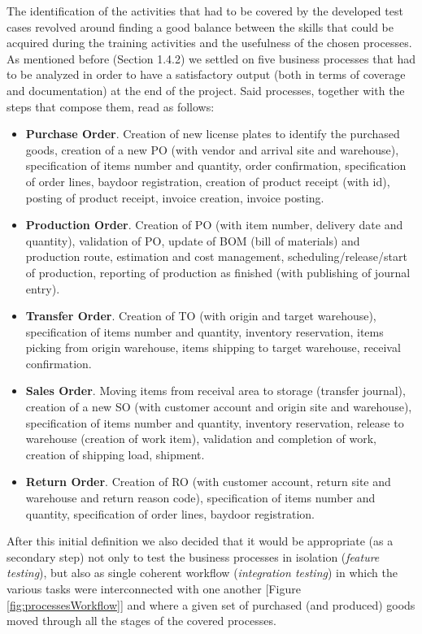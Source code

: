 The identification of the activities that had to be covered by the developed test cases revolved around finding a good balance between the skills that could be acquired during the training activities and the usefulness of the chosen processes. As mentioned before (Section 1.4.2) we settled on five business processes that had to be analyzed in order to have a satisfactory output (both in terms of coverage and documentation) at the end of the project. Said processes, together with the steps that compose them, read as follows:

\begin{itemize}
    \item \textbf{Purchase Order}. Creation of new license plates to identify the purchased goods, creation of a new PO (with vendor and arrival site and warehouse), specification of items number and quantity, order confirmation, specification of order lines, baydoor registration, creation of product receipt (with id), posting of product receipt, invoice creation, invoice posting.
    \item \textbf{Production Order}. Creation of PO (with item number, delivery date and quantity), validation of PO, update of BOM (bill of materials) and production route, estimation and cost management, scheduling/release/start of production, reporting of production as finished (with publishing of journal entry). 
    \item \textbf{Transfer Order}. Creation of TO (with origin and target warehouse), specification of items number and quantity, inventory reservation, items picking from origin warehouse, items shipping to target warehouse, receival confirmation.
    \item \textbf{Sales Order}. Moving items from receival area to storage (transfer journal), creation of a new SO (with customer account and origin site and warehouse), specification of items number and quantity, inventory reservation, release to warehouse (creation of work item), validation and completion of work, creation of shipping load, shipment.  
    \item \textbf{Return Order}. Creation of RO (with customer account, return site and warehouse and return reason code), specification of items number and quantity, specification of order lines, baydoor registration.
\end{itemize}

After this initial definition we also decided that it would be appropriate (as a secondary step) not only to test the business processes in isolation (\textit{feature testing}), but also as single coherent workflow (\textit{integration testing}) in which the various tasks were interconnected with one another [Figure \ref{fig:processesWorkflow}] and where a given set of purchased (and produced) goods moved through all the stages of the covered processes.


